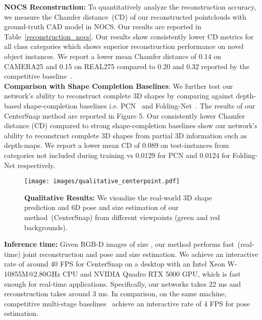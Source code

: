 \documentclass[letter, 10pt, conference]{ieeeconf}
\begin{document}
\textbf{NOCS Reconstruction:} To quantitatively analyze the reconstruction accuracy, we measure the Chamfer distance~(CD) of our reconstructed pointclouds with ground-truth CAD model in NOCS. Our results are reported in Table~\ref{reconstruction_nocs}. Our results show consistently lower CD metrics for all class categories which shows superior reconstruction performance on novel object instances. We report a lower mean Chamfer distance of 0.14 on CAMERA25 and 0.15 on REAL275 compared to 0.20 and 0.32 reported by the competitive baseline~\cite{tian2020shape}. \\ 
\textbf{Comparison with Shape Completion Baselines}: We further test our network’s ability to reconstruct complete 3D
shapes by comparing against depth-based shape-completion
baselines i.e. PCN~\cite{yuan2018pcn} and Folding-Net~\cite{yang2018foldingnet}. The results of
our CenterSnap method are reported in Figure 5. Our consistently lower Chamfer distance (CD) compared to strong
shape-completion baselines show our network’s ability to
reconstruct complete 3D shapes from partial 3D information
such as depth-maps. We report a lower mean CD of 0.089 on
test-instances from categories not included during training vs
0.0129 for PCN and 0.0124 for Folding-Net respectively.
\begin{figure}[!t]
\centering
\texttt{[image: images/qualitative\_centerpoint.pdf]}
\centering
  \caption{
  \textbf{Qualitative Results:} We visualize the real-world 3D shape prediction and 6D pose and size estimation of our method~(CenterSnap) from different viewpoints (green and red backgrounds).
  }
  \label{qualitative}
\end{figure} 
\textbf{Inference time:}
Given RGB-D images of size , our method performs fast~(real-time) joint reconstruction and pose and size estimation. We achieve an interactive rate of around 40 FPS for CenterSnap on a desktop with an Intel Xeon W-10855M@2.80GHz CPU and NVIDIA Quadro RTX 5000 GPU, which is fast enough for real-time applications. Specifically, our networks takes 22 ms and reconstruction takes around 3 ms. In comparison, on the same machine, competitive multi-stage baselines~\cite{wang2019normalized,tian2020shape} achieve an interactive rate of 4 FPS for pose estimation. \\
\renewcommand{\arraystretch}{1.0}
\end{document}
